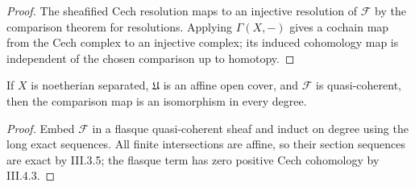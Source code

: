 \begin{proof}

The sheafified Cech resolution maps to an injective resolution of $\mathcal F$ by the comparison
theorem for resolutions.  Applying $\Gamma(X,-)$ gives a cochain map from the Cech complex to an
injective complex; its induced cohomology map is independent of the chosen comparison up to homotopy.

\end{proof}
\begin{theorem}
\label{ha-ch3-thm-cech-comparison}
If $X$ is noetherian separated, $\mathfrak U$ is an affine open cover, and
$\mathcal F$ is quasi-coherent, then the comparison map is an isomorphism in
every degree.
\end{theorem}
\begin{proof}
Embed $\mathcal F$ in a flasque quasi-coherent sheaf and
induct on degree using the long exact sequences.  All finite intersections are
affine, so their section sequences are exact by III.3.5; the flasque term has
zero positive Cech cohomology by III.4.3.
\end{proof}


